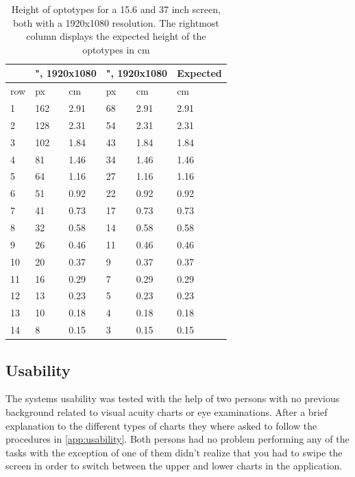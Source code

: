 \documentclass[12pt,a4paper,notitlepage]{report}
\begin{document}
\begin{table}[ht!]
\centering
\begin{tabular}{ p{1cm}|p{1cm}p{1cm}|p{1cm}p{1cm}|p{1cm} }
	 &	\multicolumn{2}{c}{\parbox{2cm}{", 1920x1080}} & \multicolumn{2}{c}{\parbox{2cm}{", 1920x1080}}	& 	Expected	\\
\hline
	 row  & px & cm & px & cm & cm \\
\hline\hline				
								1	&	162	&	2.91	&	68	&	2.91	&	2.91\\	
								2	&	128 & 	2.31	& 	54	&	2.31	&	2.31\\
		 						3	&	102 & 	1.84	& 	43	&	1.84	&	1.84\\
								4	&	81 	& 	1.46	& 	34	&	1.46	&	1.46\\
								5	&	64 	& 	1.16	& 	27	&	1.16	&	1.16\\
								6	&	51 	& 	0.92	& 	22	&	0.92	&	0.92\\
								7	&	41 	& 	0.73	& 	17	&	0.73	&	0.73\\
								8	&	32 	& 	0.58	& 	14	&	0.58	&	0.58\\
								9	&	26 	& 	0.46	& 	11	&	0.46	&	0.46\\
								10	&	20 	& 	0.37	& 	9	&	0.37	&	0.37\\
								11	&	16 	& 	0.29	& 	7	&	0.29	&	0.29\\
								12	&	13 	& 	0.23	& 	5	&	0.23	&	0.23\\
								13	&	10 	& 	0.18	& 	4	&	0.18	&	0.18\\
								14	&	8 	& 	0.15	& 	3	&	0.15	&	0.15\\
										\hline
\end{tabular}
\caption{Height of optotypes for a 15.6 and 37 inch screen, both with a 1920x1080 resolution. The rightmost column displays the expected height of the optotypes in cm} \label{tab:optotype_test}
\end{table}


\subsection{Usability}
The systems usability was tested with the help of two persons with no previous background related to visual acuity charts or eye examinations. After a brief explanation to the different types of charts they where asked to follow the procedures in \ref{app:usability}. Both persons had no problem performing any of the tasks with the exception of one of them didn't realize that you had to swipe the screen in order to switch between the upper and lower charts in the application.
\end{document}
